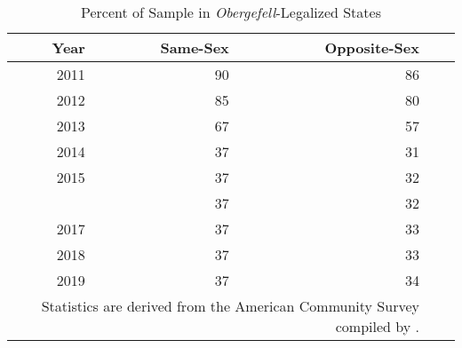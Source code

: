\begin{table}[htbp]

\caption{Percent of Sample in \textit{Obergefell}-Legalized States}
\label{tab: prop_newlegal} %
\centering
\begin{tabular}[t]{rrrrr}
\toprule
\cmidrule(l{3pt}r{3pt}){2-3} \cmidrule(l{3pt}r{3pt}){4-5}
Year & Same-Sex & Opposite-Sex\\
\midrule
2011 & 90 & 86\\
2012 & 85 & 80\\
2013 & 67 & 57\\
2014 & 37 & 31\\
2015 & 37 & 32\\
\addlinespace
2016 & 37 & 32\\
2017 & 37 & 33\\
2018 & 37 & 33\\
2019 & 37 & 34\\
\bottomrule
\multicolumn{3}{p{\linewidth}}{\footnotesize Statistics are derived from the American Community Survey compiled by \citet{28}.} \\
\end{tabular}
\end{table}
